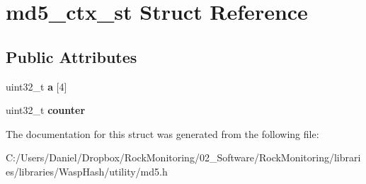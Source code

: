 \hypertarget{structmd5__ctx__st}{}\section{md5\+\_\+ctx\+\_\+st Struct Reference}
\label{structmd5__ctx__st}
\subsection*{Public Attributes}
\begin{DoxyCompactItemize}
\item 
uint32\+\_\+t {\bfseries a} \mbox{[}4\mbox{]}\hypertarget{structmd5__ctx__st_a6d130c480d0ee188d2066c840f585659}{}\label{structmd5__ctx__st_a6d130c480d0ee188d2066c840f585659}

\item 
uint32\+\_\+t {\bfseries counter}\hypertarget{structmd5__ctx__st_aafcfb68f78df4915a03a021608e96d29}{}\label{structmd5__ctx__st_aafcfb68f78df4915a03a021608e96d29}

\end{DoxyCompactItemize}


The documentation for this struct was generated from the following file\+:\begin{DoxyCompactItemize}
\item 
C\+:/\+Users/\+Daniel/\+Dropbox/\+Rock\+Monitoring/02\+\_\+\+Software/\+Rock\+Monitoring/libraries/libraries/\+Wasp\+Hash/utility/md5.\+h\end{DoxyCompactItemize}
